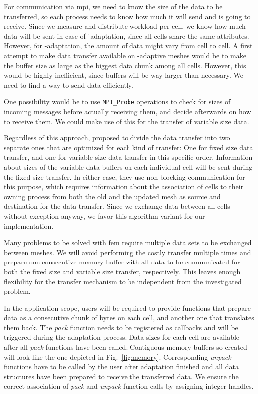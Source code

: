 For communication via \gls{mpi}, we need to know the size of the data to be transferred, so each process needs to know how much it will send and is going to receive. Since we measure and distribute workload per cell, we know how much data will be sent in case of \h-adaptation, since all cells share the same attributes. However, for \p-adaptation, the amount of data might vary from cell to cell.
A first attempt to make data transfer available on \hp-adaptive meshes would be to make the buffer size as large as the biggest data chunk among all cells. However, this would be highly inefficient, since buffers will be way larger than necessary. We need to find a way to send data efficiently.

One possibility would be to use \texttt{MPI\_Probe} \textcite{mpi31} operations to check for sizes of incoming messages before actually receiving them, and decide afterwards on how to receive them. We could make use of this for the transfer of variable size data.

Regardless of this approach, \textcite[Sec.~5.2]{burstedde2018} proposed to divide the data transfer into two separate ones that are optimized for each kind of transfer: One for fixed size data transfer, and one for variable size data transfer in this specific order. Information about sizes of the variable data buffers on each individual cell will be sent during the fixed size transfer. In either case, they use non-blocking communication for this purpose, which requires information about the association of cells to their owning process from both the old and the updated mesh as source and destination for the data transfer. Since we exchange data between all cells without exception anyway, we favor this algorithm variant for our implementation.

Many problems to be solved with \gls{fem} require multiple data sets to be exchanged between meshes. We will avoid performing the costly transfer multiple times and prepare one consecutive memory buffer with all data to be communicated for both the fixed size and variable size transfer, respectively. This leaves enough flexibility for the transfer mechanism to be independent from the investigated problem.

In the application scope, users will be required to provide functions that prepare data as a consecutive chunk of bytes on each cell, and another one that translates them back. The \textit{pack} function needs to be registered as callbacks and will be triggered during the adaptation process. Data sizes for each cell are available after all \textit{pack} functions have been called. Contiguous memory buffers so created will look like the one depicted in Fig.~\ref{fig:memory}. Corresponding \textit{unpack} functions have to be called by the user after adaptation finished and all data structures have been prepared to receive the transferred data. We ensure the correct association of \textit{pack} and \textit{unpack} function calls by assigning integer handles.

